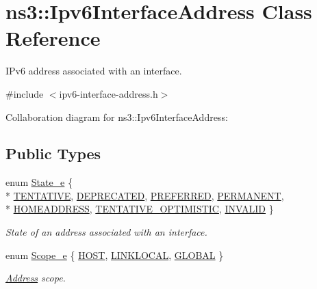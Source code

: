 \hypertarget{classns3_1_1Ipv6InterfaceAddress}{}\section{ns3\+:\+:Ipv6\+Interface\+Address Class Reference}
\label{classns3_1_1Ipv6InterfaceAddress}


I\+Pv6 address associated with an interface.  




{\ttfamily \#include $<$ipv6-\/interface-\/address.\+h$>$}



Collaboration diagram for ns3\+:\+:Ipv6\+Interface\+Address\+:
\subsection*{Public Types}
\begin{DoxyCompactItemize}
\item 
enum \hyperlink{classns3_1_1Ipv6InterfaceAddress_aa01e95b0e78bf3f0200a98f6bfe64f07}{State\+\_\+e} \{ \\*
\hyperlink{classns3_1_1Ipv6InterfaceAddress_aa01e95b0e78bf3f0200a98f6bfe64f07ab063514dcc5adedfd56f1ad77fec415c}{T\+E\+N\+T\+A\+T\+I\+VE}, 
\hyperlink{classns3_1_1Ipv6InterfaceAddress_aa01e95b0e78bf3f0200a98f6bfe64f07a8799c2e60dd113bc661d97a2e5793bf5}{D\+E\+P\+R\+E\+C\+A\+T\+ED}, 
\hyperlink{classns3_1_1Ipv6InterfaceAddress_aa01e95b0e78bf3f0200a98f6bfe64f07a26b8f336e0dd1571057d46f7a703f626}{P\+R\+E\+F\+E\+R\+R\+ED}, 
\hyperlink{classns3_1_1Ipv6InterfaceAddress_aa01e95b0e78bf3f0200a98f6bfe64f07a23dba34455497b4c13248d85e979a7a3}{P\+E\+R\+M\+A\+N\+E\+NT}, 
\\*
\hyperlink{classns3_1_1Ipv6InterfaceAddress_aa01e95b0e78bf3f0200a98f6bfe64f07a656a866656f8a4c7523793e2e86a8d73}{H\+O\+M\+E\+A\+D\+D\+R\+E\+SS}, 
\hyperlink{classns3_1_1Ipv6InterfaceAddress_aa01e95b0e78bf3f0200a98f6bfe64f07a53eead20cfcd55f67318da206a7a109f}{T\+E\+N\+T\+A\+T\+I\+V\+E\+\_\+\+O\+P\+T\+I\+M\+I\+S\+T\+IC}, 
\hyperlink{classns3_1_1Ipv6InterfaceAddress_aa01e95b0e78bf3f0200a98f6bfe64f07a5b475f38730e5a2cd323cc530163e47c}{I\+N\+V\+A\+L\+ID}
 \}\begin{DoxyCompactList}\small\item\em State of an address associated with an interface. \end{DoxyCompactList}
\item 
enum \hyperlink{classns3_1_1Ipv6InterfaceAddress_ad3f03debf9dae475b81ea9cdf81f4f27}{Scope\+\_\+e} \{ \hyperlink{classns3_1_1Ipv6InterfaceAddress_ad3f03debf9dae475b81ea9cdf81f4f27a9806b9bc3b12f48d48abf6f73b245ff8}{H\+O\+ST}, 
\hyperlink{classns3_1_1Ipv6InterfaceAddress_ad3f03debf9dae475b81ea9cdf81f4f27a29f5cd6ebe813216f28d906d89d4c56d}{L\+I\+N\+K\+L\+O\+C\+AL}, 
\hyperlink{classns3_1_1Ipv6InterfaceAddress_ad3f03debf9dae475b81ea9cdf81f4f27aaf504a3b8c1562206e6ba65b4a6cff1d}{G\+L\+O\+B\+AL}
 \}\begin{DoxyCompactList}\small\item\em \hyperlink{classns3_1_1Address}{Address} scope. \end{DoxyCompactList}
\end{DoxyCompactItemize}
